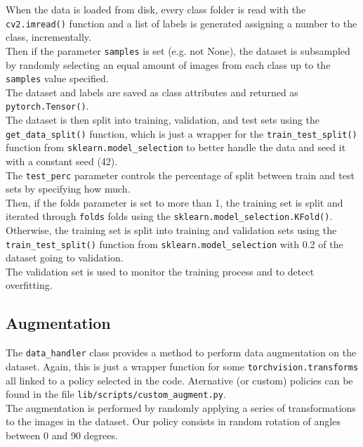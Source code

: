 \documentclass{report}
\begin{document}
When the data is loaded from disk, every class folder is read with the \texttt{cv2.imread()} function and a list of labels is generated assigning a number to the class, incrementally. \\
Then if the parameter \texttt{samples} is set (e.g. not None), the dataset is subsampled by randomly selecting an equal amount of images from each class up to the \texttt{samples} value specified. \\
The dataset and labels are saved as class attributes and returned as \texttt{pytorch.Tensor()}.\\

The dataset is then split into training, validation, and test sets using the \texttt{get\_data\_split()} function, which is just a wrapper for the \texttt{train\_test\_split()} function from \texttt{sklearn.model\_selection} to 
better handle the data and seed it with a constant seed (42). \\
The \texttt{test\_perc} parameter controls the percentage of split between train and test sets by specifying how much. \\

Then, if the folds parameter is set to more than 1, the training set is split and iterated through \texttt{folds} folds using the \texttt{sklearn.model\_selection.KFold()}. \\
Otherwise, the training set is split into training and validation sets using the \texttt{train\_test\_split()} function from \texttt{sklearn.model\_selection} with 0.2 of the dataset going to validation. \\
The validation set is used to monitor the training process and to detect overfitting. \\

\subsection{Augmentation}
The \texttt{data\_handler} class provides a method to perform data augmentation on the dataset. Again, this is just a wrapper function for some \texttt{torchvision.transforms} 
all linked to a policy selected in the code. Aternative (or custom) policies can be found in the file \texttt{lib/scripts/custom\_augment.py}. \\

The augmentation is performed by randomly applying a series of transformations to the images in the dataset. Our policy consists in random rotation of angles between 0 and 90 degrees.\\
\end{document}

